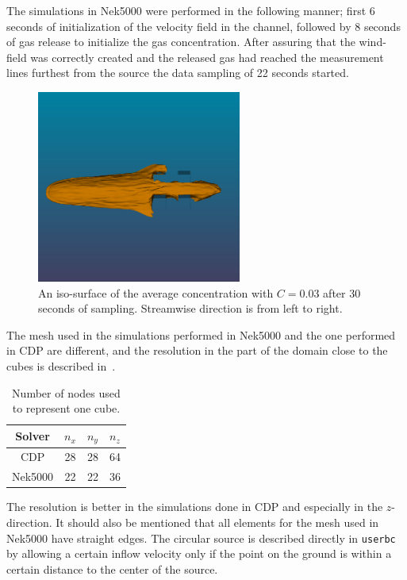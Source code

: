 The simulations in Nek5000 were performed in the following manner; first 6 seconds of initialization of the velocity field in the 
channel, followed by 8 seconds of gas release to initialize the gas concentration. After assuring that the wind-field was 
correctly created and the released gas had reached the measurement lines furthest from the source the data sampling of 22 seconds 
started.
%
\begin{figure}[h]
	\centering
	\includegraphics[width=0.6\textwidth]{Figures/plume2.png}
	\caption{An iso-surface of the average concentration with $C=0.03$ 
    after 30 seconds of sampling. Streamwise direction is from left to right.}
	\label{fig:plume}
\end{figure}
%

The mesh used in the simulations performed in Nek5000 and the one performed in CDP are 
different, and the resolution in the part of the domain close to the cubes is described 
in~.
\begin{table}
    \centering
    \begin{tabular}{c| c c c}
        Solver   & $n_x$& $n_y$ & $n_z$ \\ \hline
        CDP      & 28 & 28 & 64 \\ 
        Nek5000  & 22 & 22 & 36 
    \end{tabular}
    \caption{Number of nodes used to represent one cube.}
    \label{tab:meshdiff}
\end{table}

The resolution is better in the simulations done in CDP and especially in 
the $z$-direction. It should also be mentioned that all elements for the mesh used in Nek5000
have straight edges. The circular source is described directly in \verb|userbc| by allowing 
a certain inflow velocity only if the point on the ground is within a certain distance 
to the center of the source.

